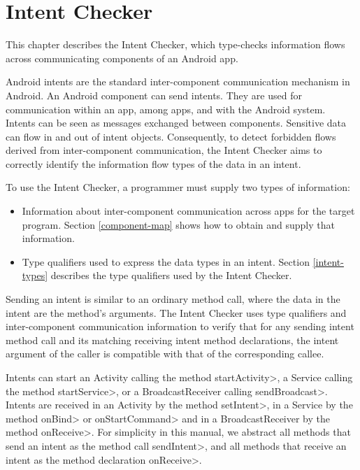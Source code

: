 \htmlhr

\newcommand{\tp}[1]{\mathit{typeof}}
\newcommand{\Fix}[1]{\textbf{[[}{\color{red} #1}\textbf{]]}}
\newcommand{\theIntentChecker}{the Intent Checker\xspace}
\newcommand{\TheIntentChecker}{The Intent Checker\xspace}
\newcommand{\sendIntent}{\<sendIntent>}
\newcommand{\onReceive}{\<onReceive>}


\chapter{Intent Checker\label{intent-checker}}

This chapter describes \theIntentChecker{},
which type-checks information flows across communicating components of an
Android app.

Android intents are the standard inter-component communication
mechanism in Android. An Android component can send intents. They are used for
communication within an app, among apps, and with the Android system.
Intents can be seen as messages exchanged between components. Sensitive
data can flow in and out of intent objects. Consequently, to detect forbidden
flows derived from inter-component communication, \theIntentChecker{} aims to
correctly identify the information flow types of the data in an intent.

To use \theIntentChecker{}, a programmer must supply two types of information:
\begin{itemize}
\item
Information about inter-component communication across apps for the target
program. Section \ref{component-map} shows how to obtain and supply that
information.
\item
Type qualifiers used to express the data types in an intent. Section
\ref{intent-types} describes the type qualifiers used by \theIntentChecker.
\end{itemize}

Sending an intent is similar to an ordinary method call,
where the data in the intent are the method's arguments. 
\TheIntentChecker{} uses type qualifiers and inter-component communication
information to verify that for any sending intent method
call and its matching receiving intent method declarations,
the intent argument of the caller is compatible with that of the corresponding
callee. 

Intents can start an Activity calling the method \<startActivity>, a
Service calling the method \<startService>, or a BroadcastReceiver
calling \<sendBroadcast>. Intents are received in an Activity by the method
\<setIntent>, in a Service by the method \<onBind> or
\<onStartCommand> and in a BroadcastReceiver by the method
\<onReceive>. For simplicity in this manual, we abstract all methods
that send an intent as the method call \sendIntent{}, and all methods that
receive an intent as the method declaration \onReceive{}.

